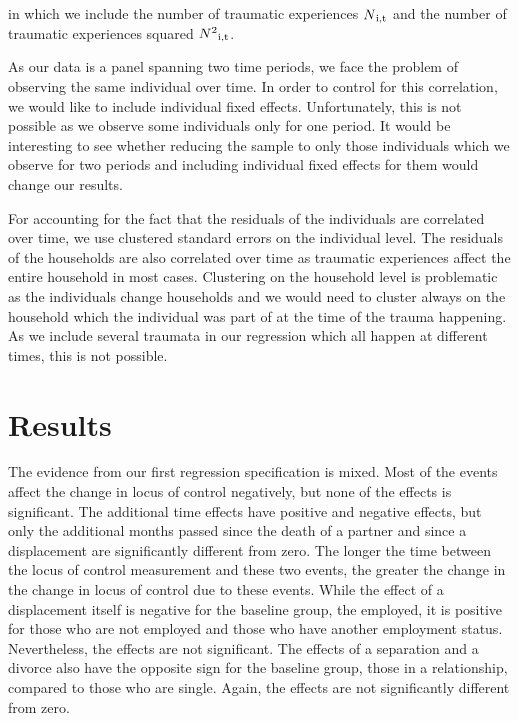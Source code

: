 \documentclass[12pt, a4paper, fleqn, parskip]{scrartcl}
\begin{document}
in which we include the number of traumatic experiences $N \textsubscript{i,t}$
and the number of traumatic experiences squared $N
\textsuperscript{2}\textsubscript{i,t}$.

As our data is a panel spanning two time periods, we face the problem of
observing the same individual over time. In order to control for this
correlation, we would like to include individual fixed effects. Unfortunately,
this is not possible as we observe some individuals only for one period. It
would be interesting to see whether reducing the sample to only those
individuals which we observe for two periods and including individual fixed
effects for them would change our results.

For accounting for the fact that the residuals of the individuals are
correlated over time, we use clustered standard errors on the individual level.
The residuals of the households are also correlated over time as traumatic
experiences affect the entire household in most cases. Clustering on the
household level is problematic as the individuals change households and we
would need to cluster always on the household which the individual was part of
at the time of the trauma happening. As we include several traumata in our
regression which all happen at different times, this is not possible.

\section{Results} %
\label{sec:results}

The evidence from our first regression specification is mixed. Most of the
events affect the change in locus of control negatively, but none of the
effects is significant. The additional time effects have positive and negative
effects, but only the additional months passed since the death of a partner and
since a displacement are significantly different from zero. The longer the time
between the locus of control measurement and these two events, the greater the
change in the change in locus of control due to these events. While the effect
of a displacement itself is negative for the baseline group, the employed, it
is positive for those who are not employed and those who have another
employment status. Nevertheless, the effects are not significant. The effects
of a separation and a divorce also have the opposite sign for the baseline
group, those in a relationship, compared to those who are single. Again, the
effects are not significantly different from zero.
\end{document}
